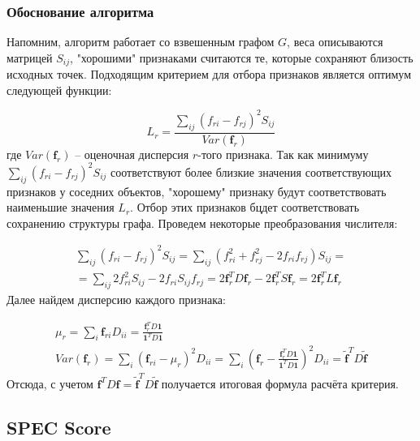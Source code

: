 \subsubsection{Обоснование алгоритма}

Напомним, алгоритм работает со взвешенным графом $G$, веса описываются матрицей $S_{ij}$, "хорошими" признаками считаются те, которые сохраняют близость исходных точек. Подходящим критерием для отбора признаков является оптимум следующей функции\cite{he2005laplacian}:

\begin{equation} \label{goal_function:1}
	L_r=\frac{\sum_{ij}(f_{ri} - f_{rj})^2 S_{ij}}{Var(\mathbf{f}_r)}
\end{equation} 
где $Var(\mathbf{f}_r)$ -- оценочная дисперсия $r$-того признака. Так как минимуму $\sum_{ij}(f_{ri} - f_{rj})^2 S_{ij}$ соответствуют более близкие значения соответствующих признаков у соседних объектов, "хорошему" признаку будут соответствовать наименьшие значения $L_r$. Отбор этих признаков бцдет соответствовать сохранению структуры графа. Проведем некоторые преобразования числителя:

\begin{equation}
	\begin{array}{l}
	\sum_{ij} (f_{ri} - f_{rj})^2 S_{ij} = \sum_{ij} (f_{ri}^2 + f_{rj}^2 -2 f_{ri} f_{rj}) S_{ij} = \\
	= \sum_{ij} 2 f_{ri}^2 S_{ij} - 2 f_{ri}  S_{ij} f_{rj} = 2 \mathbf{f}_r^T D \mathbf{f}_r - 2 \mathbf{f}_r^T S \mathbf{f}_r = 2 \mathbf{f}_r^T L \mathbf{f}_r
	\end{array}
\end{equation}
Далее найдем дисперсию каждого признака:

\begin{equation}
	\begin{array}{l}
	\mu_r = \sum_i \mathbf{f}_{ri} D_{ii} = \frac{\mathbf{f}_r^T D \mathbf{1}}{\mathbf{1}^T D \mathbf{1}} \\
	Var(\mathbf{f}_r) = \sum_i (\mathbf{f}_{ri} - \mu_r)^2 D_{ii} = \sum_i (\mathbf{f}_r - \frac{\mathbf{f}_r^T D \mathbf{1}}{\mathbf{1}^T D \mathbf{1}})^2 D_{ii} = \widetilde{\mathbf{f}}^T D \widetilde{\mathbf{f}}
	\end{array}
\end{equation}
Отсюда, с учетом $\mathbf{f}^T D \mathbf{f} = \widetilde{\mathbf{f}}^T D \widetilde{\mathbf{f}}$ получается итоговая формула расчёта критерия.

\subsection{SPEC Score}
